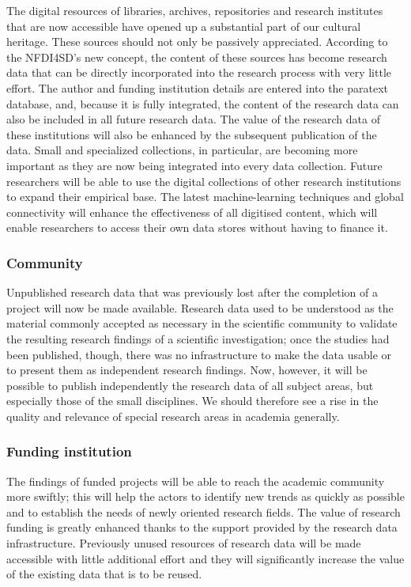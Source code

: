 \documentclass[
  english,
  paper=a4,
  oneside,captions=tableheading
]{scrbook}
\begin{document}
The digital resources of libraries, archives, repositories and research
institutes that are now accessible have opened up a substantial part of
our cultural heritage. These sources should not only be passively
appreciated. According to the NFDI4SD's new concept, the content of
these sources has become research data that can be directly incorporated
into the research process with very little effort. The author and
funding institution details are entered into the paratext database, and,
because it is fully integrated, the content of the research data can
also be included in all future research data. The value of the research
data of these institutions will also be enhanced by the subsequent
publication of the data. Small and specialized collections, in
particular, are becoming more important as they are now being integrated
into every data collection. Future researchers will be able to use the
digital collections of other research institutions to expand their
empirical base. The latest machine-learning techniques and global
connectivity will enhance the effectiveness of all digitised content,
which will enable researchers to access their own data stores without
having to finance it.

\hypertarget{community}{%
\subsubsection{Community}\label{community}}

Unpublished research data that was previously lost after the completion
of a project will now be made available. Research data used to be
understood as the material commonly accepted as necessary in the
scientific community to validate the resulting research findings of a
scientific investigation; once the studies had been published, though,
there was no infrastructure to make the data usable or to present them
as independent research findings. Now, however, it will be possible to
publish independently the research data of all subject areas, but
especially those of the small disciplines. We should therefore see a
rise in the quality and relevance of special research areas in academia
generally.

\hypertarget{funding-institution}{%
\subsubsection{Funding institution}\label{funding-institution}}

The findings of funded projects will be able to reach the academic
community more swiftly; this will help the actors to identify new trends
as quickly as possible and to establish the needs of newly oriented
research fields. The value of research funding is greatly enhanced
thanks to the support provided by the research data infrastructure.
Previously unused resources of research data will be made accessible
with little additional effort and they will significantly increase the
value of the existing data that is to be reused.
\end{document}
